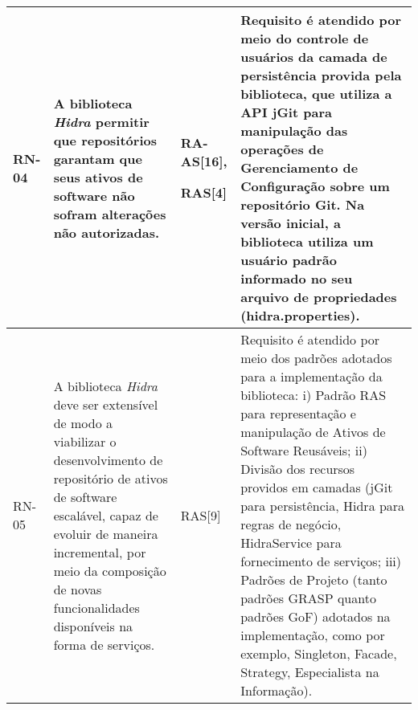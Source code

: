 \begin{longtable}{ | l | p{4cm} | p{2cm} | p{6cm} |}
	RN-04
	& A biblioteca \textit{Hidra} permitir que repositórios garantam que seus ativos de software não sofram alterações não autorizadas.
	& RA-AS[16],

	RAS[4]
	& Requisito é atendido por meio do controle de usuários da camada de persistência provida pela biblioteca, que utiliza a API jGit para manipulação das operações de Gerenciamento de Configuração sobre um repositório Git. Na versão inicial, a biblioteca utiliza um usuário padrão informado no seu arquivo de propriedades (hidra.properties).
	\\ \hline

	RN-05
	& A biblioteca \textit{Hidra} deve ser extensível de modo a viabilizar o desenvolvimento de repositório de ativos de software escalável, capaz de evoluir de maneira incremental, por meio da composição de novas funcionalidades disponíveis na forma de serviços.
	& RAS[9] 
	& Requisito é atendido por meio dos padrões adotados para a implementação da biblioteca: i) Padrão RAS para representação e manipulação de Ativos de Software Reusáveis; ii) Divisão dos recursos providos em camadas (jGit para persistência, Hidra para regras de negócio, HidraService para fornecimento de serviços; iii) Padrões de Projeto (tanto padrões GRASP quanto padrões GoF) adotados na implementação, como por exemplo, Singleton, Facade, Strategy, Especialista na Informação).
 \\ \hline 

\end{longtable}






